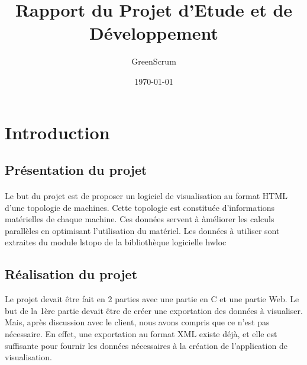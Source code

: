 \documentclass[12pt]{article}
\begin{document}
\title{Rapport du Projet d'Etude et de Développement}
\author{GreenScrum}
\date{\today}

\maketitle

\section{Introduction}
\subsection{Présentation du projet}
\paragraph{}
	Le but du projet est de proposer un logiciel de visualisation au format HTML d'une topologie de machines. Cette topologie est constituée d'informations matérielles de chaque machine. Ces données servent à àméliorer les calculs parallèles en optimisant l'utilisation du matériel. Les données à utiliser sont extraites du module lstopo de la bibliothèque logicielle hwloc

\subsection{Réalisation du projet}
Le projet devait être fait en 2 parties avec une partie en C et une partie Web. Le but de la 1ère partie devait être de créer une exportation des données à visualiser. Mais, après discussion avec le client, nous avons compris que ce n'est pas nécessaire. En effet, une exportation au format XML existe déjà, et elle est suffisante pour fournir les données nécessaires à la création de l'application de visualisation. 
\end{document}
